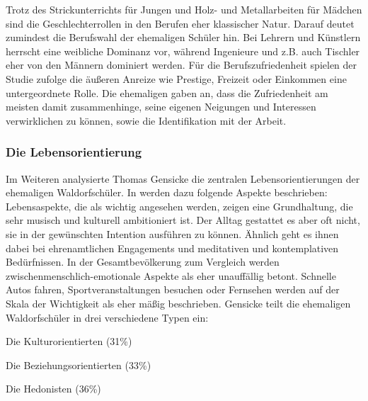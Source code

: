 Trotz des Strickunterrichts für Jungen und Holz- und Metallarbeiten für Mädchen sind die Geschlechterrollen in den Berufen eher klassischer Natur. 
Darauf deutet zumindest die Berufswahl der ehemaligen Schüler hin. 
Bei Lehrern und Künstlern herrscht eine weibliche Dominanz vor, während Ingenieure und z.B. auch Tischler eher von den Männern dominiert werden. 
Für die Berufszufriedenheit spielen der Studie zufolge die äußeren Anreize wie Prestige, Freizeit oder Einkommen eine untergeordnete Rolle. 
Die ehemaligen gaben an, dass die Zufriedenheit am meisten damit zusammenhinge, seine eigenen Neigungen und Interessen verwirklichen zu können, sowie die Identifikation mit der Arbeit. 

\subsubsection{Die Lebensorientierung}
\label{subsub:lebensorientierung}

Im Weiteren analysierte Thomas Gensicke die zentralen Lebensorientierungen der ehemaligen Waldorfschüler. 
In \citet[][S. 17ff]{randoll07} werden dazu folgende Aspekte beschrieben: Lebensaspekte, die als wichtig angesehen werden, zeigen eine Grundhaltung, die sehr musisch und kulturell ambitioniert ist. Der Alltag gestattet es aber oft nicht, sie in der gewünschten Intention ausführen zu können. Ähnlich geht es ihnen dabei bei ehrenamtlichen Engagements und meditativen und kontemplativen Bedürfnissen. 
In der Gesamtbevölkerung zum Vergleich werden zwischenmenschlich-emotionale Aspekte als eher unauffällig betont. 
Schnelle Autos fahren, Sportveranstaltungen besuchen oder Fernsehen werden auf der Skala der Wichtigkeit als eher mäßig  beschrieben. 
Gensicke teilt die ehemaligen Waldorfschüler in drei verschiedene Typen ein: 
	\begin{compactitem}
		\item Die Kulturorientierten (31\%)
		\item Die Beziehungsorientierten (33\%)
		\item Die Hedonisten (36\%)
	\end{compactitem}

